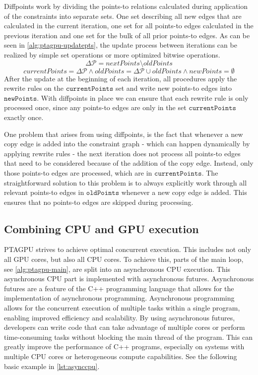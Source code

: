 Diffpoints work by dividing the points-to relations calculated during application of the constraints into separate sets.
One set describing all new edges that are calculated in the current iteration, one set for all points-to edges calculated in the previous iteration and one set for the bulk of all prior points-to edges.
As can be seen in \autoref{alg:ptagpu-updatepts}, the update process between iterations can be realized by simple set operations or more optimized bitwise operations.
$$\Delta \mathcal{P} = nextPoints\setminus oldPoints$$
$$currentPoints = \Delta \mathcal{P}\wedge oldPoints = \Delta \mathcal{P} \cup oldPoints\wedge newPoints = \emptyset$$
After the update at the beginning of each iteration, all procedures apply the rewrite rules on the $\mathtt{currentPoints}$ set and write new points-to edges into $\mathtt{newPoints}$.
With diffpoints in place we can ensure that each rewrite rule is only processed once, since any points-to edges are only in the set $\mathtt{currentPoints}$ exactly once.

One problem that arises from using diffpoints, is the fact that whenever a new copy edge is added into the constraint graph - which can happen dynamically by applying rewrite rules - the next iteration does not process all points-to edges that need to be considered because of the addition of the copy edge. Instead, only those points-to edges are processed, which are in $\mathtt{currentPoints}$. The straightforward solution to this problem is to always explicitly work through all relevant points-to edges in $\mathtt{oldPoints}$ whenever a new copy edge is added.
This ensures that no points-to edges are skipped during processing.
\subsection{Combining CPU and GPU execution}\label{sec:cpugpu}
PTAGPU strives to achieve optimal concurrent execution.
This includes not only all GPU cores, but also all CPU cores.
To achieve this, parts of the main loop, see \autoref{alg:ptagpu-main}, are split into an asynchronous CPU execution.
This asynchronous CPU part is implemented with asynchronous futures.
Asynchronous futures are a feature of the C++ programming language that allows for the implementation of asynchronous programming. Asynchronous programming allows for the concurrent execution of multiple tasks within a single program, enabling improved efficiency and scalability. By using asynchronous futures, developers can write code that can take advantage of multiple cores or perform time-consuming tasks without blocking the main thread of the program. This can greatly improve the performance of C++ programs, especially on systems with multiple CPU cores or heterogeneous compute capabilities. See the following basic example in \autoref{lst:asynccpu}.

